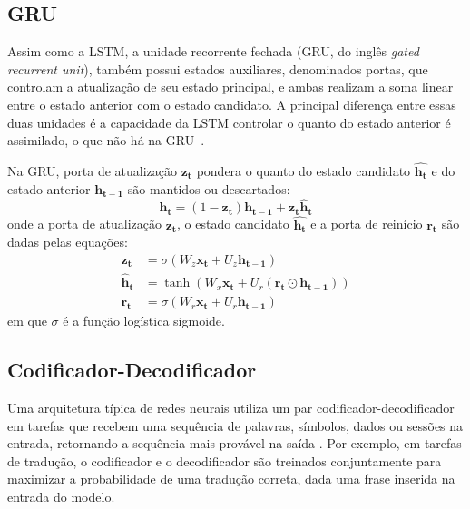 \subsection{GRU}
Assim como a LSTM, a unidade recorrente fechada (GRU, do inglês \textit{gated
recurrent unit}), também possui estados auxiliares, denominados portas, que
controlam a atualização de seu estado principal, e ambas realizam a soma linear
entre o estado anterior com o estado candidato. A principal diferença entre
essas duas unidades é a capacidade da LSTM controlar o quanto do estado anterior
é assimilado, o que não há na GRU~\cite{chung2014empirical}.

Na GRU, porta de atualização $\mathbf{z_t}$ pondera o quanto do
estado candidato $\mathbf{\hat{h_t}}$ e do estado anterior $\mathbf{h_{t-1}}$
são mantidos ou descartados:
\begin{equation}
    \mathbf{h_t} = (1 - \mathbf{z_t})\mathbf{h_{t-1}} + \mathbf{z_t}\mathbf{\hat{h}_t}
\end{equation}
onde a porta de atualização $\mathbf{z_t}$, o estado candidato $\mathbf{\hat{h_t}}$
e a porta de reinício $\mathbf{r_t}$ são dadas pelas equações:
\begin{align}
    \mathbf{z_t} &= \sigma(W_z\mathbf{x_t} + U_z\mathbf{h_{t-1}}) \\
    \mathbf{\hat{h}_t} &= \tanh(W_x\mathbf{x_t} + U_r(\mathbf{r_t} \odot \mathbf{h_{t-1}})) \\
    \mathbf{r_t} &= \sigma(W_r\mathbf{x_t} + U_r\mathbf{h_{t-1}})
\end{align}
em que $\sigma$ é a função logística sigmoide.

\subsection{Codificador-Decodificador}
Uma arquitetura típica de redes neurais utiliza um par codificador-decodificador
em tarefas que recebem uma sequência de palavras, símbolos, dados ou sessões na
entrada, retornando a sequência mais provável na saída
\cite{bahdanau2016neural}. Por exemplo, em tarefas de tradução, o codificador e
o decodificador são treinados conjuntamente para maximizar a probabilidade de
uma tradução correta, dada uma frase inserida na entrada do modelo.

      
